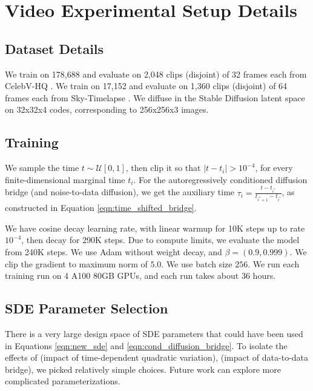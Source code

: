 \section{Video Experimental Setup Details}\label{sec:video_experimental_setup}

\subsection{Dataset Details}\label{subsec:video_dataset}

We train on 178,688 and evaluate on 2,048 clips (disjoint) of 32 frames each from CelebV-HQ \cite{zhu2022celebv}. We train on 17,152 and evaluate on 1,360 clips (disjoint) of 64 frames each from Sky-Timelapse \cite{zhang2020dtvnet}. We diffuse in the Stable Diffusion latent space \cite{rombach2022high} on 32x32x4 codes, corresponding to 256x256x3 images.

\subsection{Training}\label{subsec:training_details}

We sample the time $t \sim \mathcal{U}[0, 1]$, then clip it so that $|t - t_i| > 10^{-4}$, for every finite-dimensional marginal time $t_i$. For the autoregressively conditioned diffusion bridge (and noise-to-data diffusion), we get the auxiliary time $\tau_i = \frac{t - t_{i^*}}{t_{i^*+1} - t_{i^*}}$, as constructed in Equation \ref{eqn:time_shifted_bridge}.

We have cosine decay learning rate, with linear warmup for 10K steps up to rate $10^{-4}$, then decay for 290K steps. Due to compute limits, we evaluate the model from 240K steps. We use Adam \cite{kingma2014adam} without weight decay, and $\beta = (0.9, 0.999)$. We clip the gradient to maximum norm of $5.0$. We use batch size $256$. We run each training run on 4 A100 80GB GPUs, and each run takes about 36 hours.

\subsection{SDE Parameter Selection}\label{subsec:sde_parameter_selection}

There is a very large design space of SDE parameters that could have been used in Equations \ref{eqn:new_sde} and \ref{eqn:cond_diffusion_bridge}. To isolate the effects of  (impact of time-dependent quadratic variation),  (impact of data-to-data bridge), we picked relatively simple choices. Future work can explore more complicated parameterizations.


